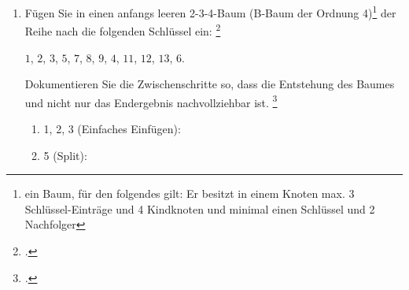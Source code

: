 \documentclass{bschlangaul-aufgabe}
\begin{document}

\begin{enumerate}


\item Fügen Sie in einen anfangs leeren 2-3-4-Baum (B-Baum der Ordnung
4)\footnote{ein Baum, für den folgendes gilt: Er besitzt in einem Knoten
max. 3 Schlüssel-Einträge und 4 Kindknoten und minimal einen Schlüssel
und 2 Nachfolger} der Reihe nach die folgenden Schlüssel ein:
\footcite[entnommen aus Algorithmen und
Datenstrukturen, Übungsblatt 6, Universität Würzburg, Aufgabe 9]{aud:pu:7}

\bigskip

\centerline{$1$, $2$, $3$, $5$, $7$, $8$, $9$, $4$, $11$, $12$, $13$, $6$.}

\bigskip

Dokumentieren Sie die Zwischenschritte so,
dass die Entstehung des Baumes und nicht nur das Endergebnis
nachvollziehbar ist. \footcite[Staatsexamen Theoretische Informatik,
Algorithmen und Datenstrukturen, Realschulen, Frühjahr 2011, Thema 1
Aufgabe 3]{examen:46115:2011:03}

\begin{bAntwort}
\begin{multicols}{2}
\begin{enumerate}

%

\item 1, 2, 3 (Einfaches Einfügen):


%

\item 5 (Split):



\end{enumerate}
\end{multicols}
\end{bAntwort}
\end{enumerate}
\end{document}
